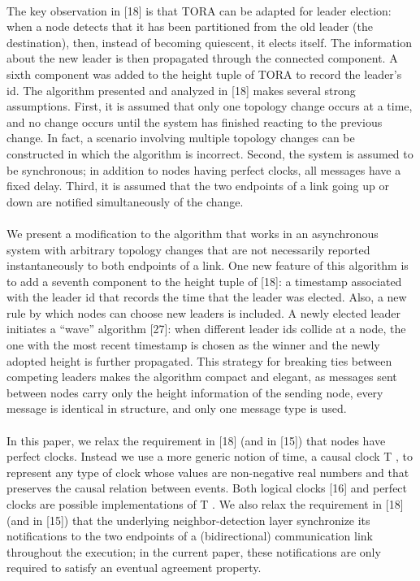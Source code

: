 \paragraph{}The key observation in [18] is that TORA can be adapted for leader election: when a node detects that it has been partitioned from the old leader (the destination), then, instead of becoming quiescent, it elects itself. The information about the new leader is then propagated through the connected component. A sixth component was added to the height tuple of TORA to record the leader’s id. The algorithm presented and analyzed in [18] makes several strong assumptions. First, it is assumed that only one topology change occurs at a time, and no change occurs until the system has finished reacting to the previous change. In fact, a scenario involving multiple topology changes can be constructed in which the algorithm is incorrect. Second, the system is assumed to be synchronous; in addition to nodes having perfect clocks, all messages have a fixed delay. Third, it is assumed that the two endpoints of a link going up or down are notified simultaneously of the change.
\paragraph{}We present a modification to the algorithm that works in an asynchronous system with arbitrary topology changes that are not necessarily reported instantaneously to both endpoints of a link. One new feature of this algorithm is to add a seventh component to the height tuple of [18]: a timestamp associated with the leader id that records the time that the leader was elected. Also, a new rule by which nodes can choose new leaders is included. A newly elected leader initiates a “wave” algorithm [27]: when different leader ids collide at a node, the one with the most recent timestamp is chosen as the winner and the newly adopted height is further propagated. This strategy for breaking ties between competing leaders makes the algorithm compact and elegant, as messages sent between nodes carry only the height information of the sending node, every message is identical in structure, and only one message type is used.
\paragraph{}In this paper, we relax the requirement in [18] (and in [15]) that nodes have perfect clocks. Instead we use a more generic notion of time, a causal clock T , to represent any type of clock whose values are non-negative real numbers and that preserves the causal relation between events. Both logical clocks [16] and perfect clocks are possible implementations of T . We also relax the requirement in [18] (and in [15]) that the underlying neighbor-detection layer synchronize its notifications to the two endpoints of a (bidirectional) communication link throughout the execution; in the current paper, these notifications are only required to satisfy an eventual agreement property.
